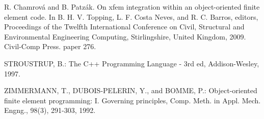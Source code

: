 \documentclass[a4paper]{article}
\begin{document}
\begin{thebibliography}{9}
 R. Chamrov\'{a} and B. Patz\'{a}k. On xfem integration within an object-oriented finite element code. In B. H. V. Topping, L. F. Costa Neves, and R. C. Barros, editors, Proceedings of the Twelfth International Conference on Civil, Structural and Environmental Engineering Computing, Stirlingshire, United Kingdom, 2009. Civil-Comp Press. paper 276.

 STROUSTRUP, B.: {The C++ Programming Language - 3rd ed,}
Addison-Wesley, 1997.

 ZIMMERMANN, T., DUBOIS-PELERIN, Y., and BOMME, P.: {Object-oriented finite element programming: I. Governing principles,} Comp. Meth. in Appl. Mech. Engng., 98(3), 291-303, 1992. 
\end{thebibliography}
\end{document}
